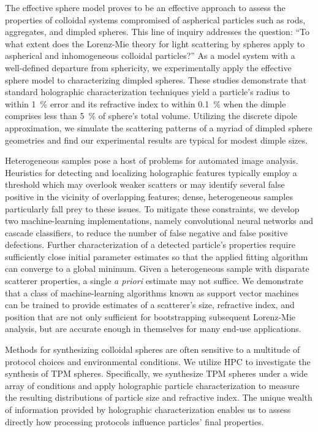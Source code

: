 The effective sphere model proves to be an effective approach
to assess the properties of colloidal
systems compromised of aspherical particles such as rods,
aggregates, and dimpled spheres.
This line of inquiry addresses the question:
``To what extent does the Lorenz-Mie theory for light scattering
by spheres apply to aspherical and inhomogeneous colloidal particles?''
As a model system with a well-defined departure from sphericity,
we experimentally apply the effective sphere model to
characterizing dimpled spheres.
These studies demonstrate that standard holographic characterization
techniques yield a particle's radius to within \SI{1}{\percent} error
and its refractive index to within \SI{0.1}{\percent}
when the dimple comprises less than \SI{5}{\percent} of sphere's total volume.
Utilizing the discrete dipole
approximation, we simulate the scattering patterns of a myriad of
dimpled sphere geometries and find our experimental results are
typical for modest dimple sizes.

Heterogeneous samples pose a host of problems for automated
image analysis. Heuristics for detecting and localizing holographic
features typically employ a threshold which may overlook weaker
scatters or may identify several false positive in the vicinity of
overlapping features; dense, heterogeneous samples
particularly fall prey to these issues. To mitigate these constraints, we
develop two machine-learning implementations, namely convolutional
neural networks and cascade classifiers, to reduce the number of
false negative and false positive defections. 
Further characterization of a detected particle's properties require
sufficiently close initial parameter estimates so that the applied
fitting algorithm can converge to a global minimum.
 Given a heterogeneous sample
with disparate scatterer properties, a single \emph{a priori}
estimate may not suffice. We demonstrate that a class of machine-learning
algorithms known as support vector machines can be trained to
provide estimates of a scatterer's size, refractive index, and
position that are not only sufficient for bootstrapping subsequent
Lorenz-Mie analysis, but are accurate enough in themselves
for many end-use applications.

Methods for synthesizing colloidal spheres are often sensitive
to a multitude of protocol choices and environmental conditions. We
utilize HPC to investigate the synthesis of TPM spheres.
Specifically, we synthesize TPM spheres under a wide array of
conditions and apply holographic particle characterization to measure the
resulting distributions of particle size and refractive index.
The unique wealth of information provided by holographic characterization
enables us to assess directly how processing protocols influence
particles' final properties.


